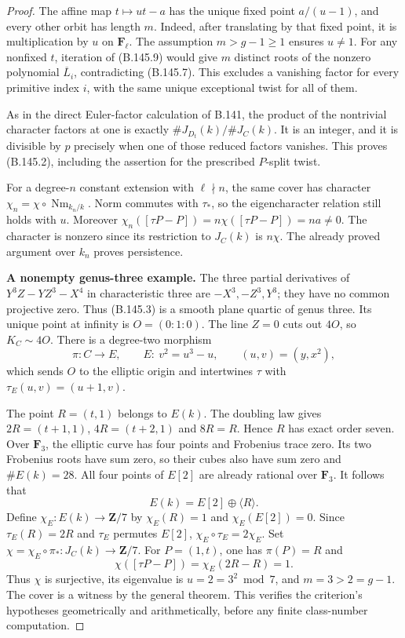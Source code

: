 \begin{proof}
The affine map $t\mapsto ut-a$ has the unique fixed point
$a/(u-1)$, and every other orbit has length $m$.
Indeed, after translating by that fixed point, it is
multiplication by $u$ on $\mathbf F_\ell$.
The assumption $m>g-1\ge1$ ensures $u\ne1$.
For any nonfixed $t$, iteration of (B.145.9) would give
$m$ distinct roots of the nonzero polynomial
$\overline L_i$, contradicting (B.145.7).
This excludes a vanishing factor for every primitive index $i$,
with the same unique exceptional twist for all of them.

As in the direct Euler-factor calculation of B.141, the product
of the nontrivial character factors at one is exactly
$\#J_{D_t}(k)/\#J_C(k)$.
It is an integer, and it is divisible by $p$ precisely when one
of those reduced factors vanishes.
This proves (B.145.2), including the assertion for the
prescribed $P$-split twist.

For a degree-$n$ constant extension with $\ell\nmid n$,
the same cover has character
$\chi_n=\chi\circ\operatorname{Nm}_{k_n/k}$.
Norm commutes with $\tau_*$, so the eigencharacter relation
still holds with $u$.
Moreover
$\chi_n([\tau P-P])=n\chi([\tau P-P])=na\ne0$.
The character is nonzero since its restriction to $J_C(k)$
is $n\chi$.
The already proved argument over $k_n$ proves persistence.

\medskip\noindent\textbf{A nonempty genus-three example.}
The three partial derivatives of
$Y^3Z-YZ^3-X^4$ in characteristic three are
$-X^3,-Z^3,Y^3$; they have no common projective zero.
Thus (B.145.3) is a smooth plane quartic of genus three.
Its unique point at infinity is $O=(0:1:0)$.
The line $Z=0$ cuts out $4O$, so $K_C\sim4O$.
There is a degree-two morphism
\[
 \pi:C\longrightarrow E,\qquad
 E:\ v^2=u^3-u,\qquad (u,v)=(y,x^2),
                                                            \tag{B.145.10}
\]
which sends $O$ to the elliptic origin and intertwines $\tau$
with $\tau_E(u,v)=(u+1,v)$.

The point $R=(t,1)$ belongs to $E(k)$.
The doubling law gives
$2R=(t+1,1)$, $4R=(t+2,1)$ and $8R=R$.
Hence $R$ has exact order seven.
Over $\mathbf F_3$, the elliptic curve has four points and
Frobenius trace zero.  Its two Frobenius roots have sum zero,
so their cubes also have sum zero and $\#E(k)=28$.
All four points of $E[2]$ are already rational over
$\mathbf F_3$.
It follows that
\[
                    E(k)=E[2]\oplus\langle R\rangle .
\]
Define $\chi_E:E(k)\to\mathbf Z/7$ by
$\chi_E(R)=1$ and $\chi_E(E[2])=0$.
Since $\tau_E(R)=2R$ and $\tau_E$ permutes $E[2]$,
$\chi_E\circ\tau_E=2\chi_E$.
Set $\chi=\chi_E\circ\pi_*:J_C(k)\to\mathbf Z/7$.
For $P=(1,t)$, one has $\pi(P)=R$ and
\[
                 \chi([\tau P-P])=\chi_E(2R-R)=1.
\]
Thus $\chi$ is surjective, its eigenvalue is $u=2=3^2\bmod7$,
and $m=3>2=g-1$.
The cover is a witness by the general theorem.
This verifies the criterion's hypotheses geometrically and
arithmetically, before any finite class-number computation.


\end{proof}
